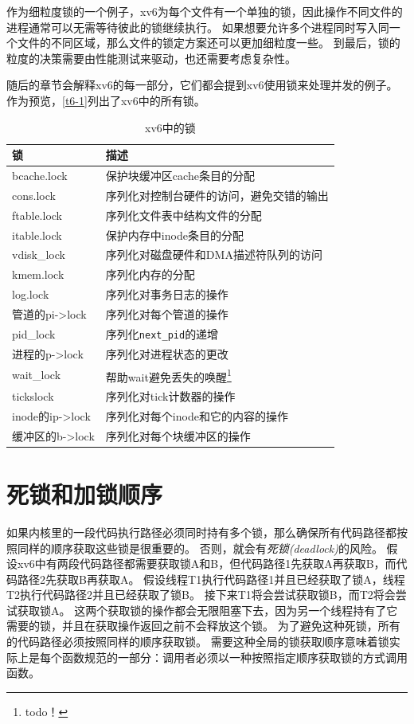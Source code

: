 作为细粒度锁的一个例子，xv6为每个文件有一个单独的锁，因此操作不同文件的进程通常可以无需等待彼此的锁继续执行。
如果想要允许多个进程同时写入同一个文件的不同区域，那么文件的锁定方案还可以更加细粒度一些。
到最后，锁的粒度的决策需要由性能测试来驱动，也还需要考虑复杂性。

随后的章节会解释xv6的每一部分，它们都会提到xv6使用锁来处理并发的例子。
作为预览，\autoref{t6-1}列出了xv6中的所有锁。

\begin{table}[htbp]
    \centering
    \begin{tabular}{l|l}
        \textbf{锁}     & \textbf{描述} \\
        \hline
        bcache.lock     & 保护块缓冲区cache条目的分配   \\
        cons.lock       & 序列化对控制台硬件的访问，避免交错的输出  \\
        ftable.lock     & 序列化文件表中结构文件的分配  \\
        itable.lock     & 保护内存中inode条目的分配     \\
        vdisk\_lock     & 序列化对磁盘硬件和DMA描述符队列的访问     \\
        kmem.lock       & 序列化内存的分配      \\
        log.lock        & 序列化对事务日志的操作    \\
        管道的pi->lock   & 序列化对每个管道的操作    \\
        pid\_lock       & 序列化\texttt{next\_pid}的递增    \\
        进程的p->lock    & 序列化对进程状态的更改   \\
        wait\_lock      & 帮助wait避免丢失的唤醒\footnote{todo！}    \\
        tickslock       & 序列化对tick计数器的操作  \\
        inode的ip->lock & 序列化对每个inode和它的内容的操作 \\
        缓冲区的b->lock  & 序列化对每个块缓冲区的操作   \\
    \end{tabular}
    \caption{xv6中的锁}
    \label{t6-1}
\end{table}

\section{死锁和加锁顺序}
如果内核里的一段代码执行路径必须同时持有多个锁，那么确保所有代码路径都按照同样的顺序获取这些锁是很重要的。
否则，就会有\emph{死锁(deadlock)}的风险。
假设xv6中有两段代码路径都需要获取锁A和B，但代码路径1先获取A再获取B，而代码路径2先获取B再获取A。
假设线程T1执行代码路径1并且已经获取了锁A，线程T2执行代码路径2并且已经获取了锁B。
接下来T1将会尝试获取锁B，而T2将会尝试获取锁A。
这两个获取锁的操作都会无限阻塞下去，因为另一个线程持有了它需要的锁，并且在获取操作返回之前不会释放这个锁。
为了避免这种死锁，所有的代码路径必须按照同样的顺序获取锁。
需要这种全局的锁获取顺序意味着锁实际上是每个函数规范的一部分：调用者必须以一种按照指定顺序获取锁的方式调用函数。

